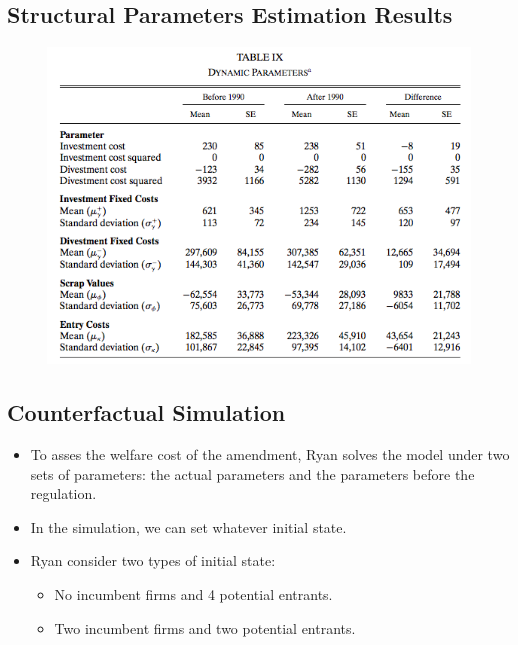 \documentclass[]{book}
\providecommand{\tightlist}{%
  \setlength{\itemsep}{0pt}\setlength{\parskip}{0pt}}
\begin{document}
\subsection{Structural Parameters Estimation
Results}\label{structural-parameters-estimation-results}

\begin{figure}

{\centering \includegraphics[width=0.8\linewidth]{figuretable/dynamic} 

}

\end{figure}

\subsection{Counterfactual Simulation}\label{counterfactual-simulation}

\begin{itemize}
\tightlist
\item
  To asses the welfare cost of the amendment, Ryan solves the model
  under two sets of parameters: the actual parameters and the parameters
  before the regulation.
\item
  In the simulation, we can set whatever initial state.
\item
  Ryan consider two types of initial state:

  \begin{itemize}
  \tightlist
  \item
    No incumbent firms and 4 potential entrants.
  \item
    Two incumbent firms and two potential entrants.
  \end{itemize}
\end{itemize}
\end{document}

